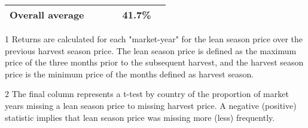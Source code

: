 \begin{table}[ht]
\begin{threeparttable}[t]
\begin{tabular}{|l|lll|l|l|}
  Overall average &  &  &  & 41.7\% &  \\ 
    \hline
\end{tabular}
\begin{tablenotes}
\item [1] \footnotesize Returns are calculated for each "market-year" for the lean season price over the previous harvest season price. The lean season price is defined as the maximum price of the three months prior to the subsequent harvest, and the harvest season price is the minimum price of the months defined as harvest season. 
\item[2] \footnotesize The final column represents a t-test by country of the proportion of market years missing a lean season price to missing harvest price. A negative (positive) statistic implies that lean season price was missing more (less) frequently.
\end{tablenotes}
\end{threeparttable}
\end{table}

